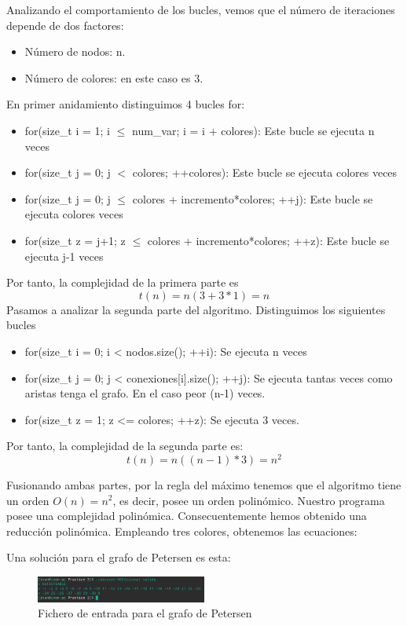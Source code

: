 \documentclass{article}
\begin{document}
    Analizando el comportamiento de los bucles, vemos que el número de iteraciones depende de dos factores: 
    \begin{itemize}
        \item Número de nodos: n.
        \item Número de colores: en este caso es 3.
    \end{itemize}
    En primer anidamiento distinguimos 4 bucles for:
    \begin{itemize}
        \item for(size\_t i = 1; i $\leq$ num\_var; i = i + colores): Este bucle se ejecuta n veces
        \item for(size\_t j = 0; j $<$ colores; ++colores): Este bucle se ejecuta colores veces
        \item for(size\_t j = 0; j $\leq$ colores + incremento*colores; ++j): Este bucle se ejecuta colores veces
        \item for(size\_t z = j+1; z $\leq$ colores + incremento*colores; ++z): Este bucle se ejecuta j-1 veces
    \end{itemize}
    
    Por tanto, la complejidad de la primera parte es 
    \[t(n) = n(3+3*1) = n\]
    Pasamos a analizar la segunda parte del algoritmo. Distinguimos los siguientes bucles
    \begin{itemize}
        \item for(size\_t i = 0; i < nodos.size(); ++i): Se ejecuta n veces
        \item for(size\_t j = 0; j < conexiones[i].size(); ++j): Se ejecuta tantas veces como aristas tenga el grafo. En el caso peor (n-1) veces.
        \item for(size\_t z = 1; z <= colores; ++z): Se ejecuta 3 veces.
    \end{itemize}
    
    Por tanto, la complejidad de la segunda parte es:
    \[t(n) = n((n-1)*3) = n^2\]
    
    Fusionando ambas partes, por la regla del máximo tenemos que el algoritmo tiene un orden $O(n) = n^2$, es decir, posee un orden polinómico. Nuestro programa posee una complejidad polinómica. Consecuentemente hemos obtenido una reducción polinómica.
    Empleando tres colores, obtenemos las ecuaciones: 
    
    Una solución para el grafo de Petersen es esta: 
    \begin{figure}[H]
            \centering
            \includegraphics[width=0.5\textwidth]{pictures/solution.png}
            \caption{Fichero de entrada para el grafo de Petersen}
        \end{figure}
        
\end{document}
